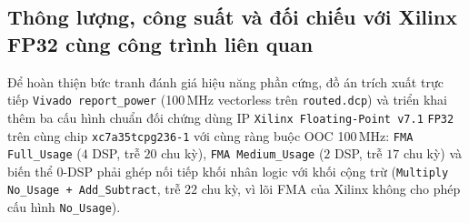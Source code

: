 \subsection{Thông lượng, công suất và đối chiếu với Xilinx FP32 cùng công trình liên quan}
Để hoàn thiện bức tranh đánh giá hiệu năng phần cứng, đồ án trích xuất trực tiếp
\texttt{Vivado report\_power} (100\,MHz vectorless trên \texttt{routed.dcp})
và triển khai thêm ba cấu hình chuẩn đối chứng dùng IP \texttt{Xilinx Floating-Point v7.1}
\texttt{FP32}~\cite{amd_pg060_fp} trên cùng chip \texttt{xc7a35tcpg236-1} với cùng
ràng buộc OOC 100\,MHz: \texttt{FMA Full\_Usage} ($4$ DSP, trễ $20$ chu kỳ),
\texttt{FMA Medium\_Usage} ($2$ DSP, trễ $17$ chu kỳ) và biến thể $0$-DSP phải
ghép nối tiếp khối nhân logic với khối cộng trừ (\texttt{Multiply No\_Usage + Add\_Subtract},
trễ $22$ chu kỳ, vì lõi FMA của Xilinx không cho phép cấu hình \texttt{No\_Usage}).




